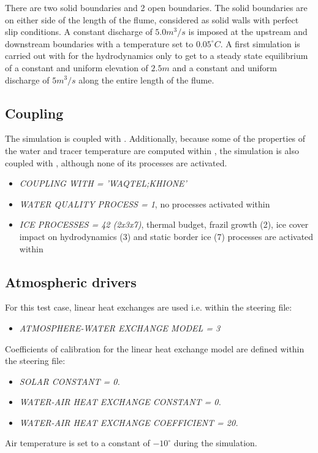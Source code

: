 There are two solid boundaries and 2 open boundaries.
The solid boundaries are on either side of the length of the flume, considered as solid walls with perfect slip conditions.
A constant discharge of $5.0m^3/s$ is imposed at the upstream and downstream boundaries with a temperature set to $0.05^{\circ} C$.
A first simulation is carried out with for the hydrodynamics only to get to a steady state equilibrium of a constant and uniform elevation of $2.5m$ and a constant and uniform discharge of $5m^3/s$ along the entire length of the flume.

\subsection{Coupling}

The simulation is coupled with \khione. Additionally, because some of the properties of the water and tracer temperature are computed within \waqtel, the simulation is also coupled with \waqtel, although none of its processes are activated.
\begin{itemize}
    \item\textit{COUPLING WITH = 'WAQTEL;KHIONE'}
    \item\textit{WATER QUALITY PROCESS = 1}, no processes activated within \waqtel
    \item\textit{ICE PROCESSES = 42 (2x3x7)}, thermal budget, frazil growth (2), ice cover impact on hydrodynamics (3) and static border ice (7) processes are activated within \khione
\end{itemize}

\subsection{Atmospheric drivers}

For this test case, linear heat exchanges are used i.e. within the \waqtel steering file:
\begin{itemize}
	\item\textit{ATMOSPHERE-WATER EXCHANGE MODEL = 3}
\end{itemize}
Coefficients of calibration for the linear heat exchange model are defined within the \khione steering file:
\begin{itemize}
	\item\textit{SOLAR CONSTANT = 0.}
	\item\textit{WATER-AIR HEAT EXCHANGE CONSTANT = 0.}
	\item\textit{WATER-AIR HEAT EXCHANGE COEFFICIENT = 20.}
\end{itemize}
Air temperature is set to a constant of $-10^{\circ}$ during the simulation.

